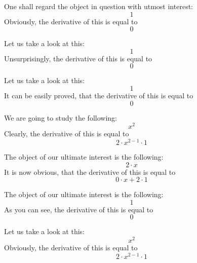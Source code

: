 \documentclass{article}
\begin{document}
One shall regard the object in question with utmost interest:
\begin{equation}
1 
\end{equation}
Obviously, the derivative of this is equal to
\begin{equation}
0 
\end{equation}

Let us take a look at this:
\begin{equation}
1 
\end{equation}
Unsurprisingly, the derivative of this is equal to
\begin{equation}
0 
\end{equation}

Let us take a look at this:
\begin{equation}
1 
\end{equation}
It can be easily proved, that the derivative of this is equal to
\begin{equation}
0 
\end{equation}

We are going to study the following:
\begin{equation}
x ^{2 } 
\end{equation}
Clearly, the derivative of this is equal to
\begin{equation}
2 \cdot x ^{2 - 1 } \cdot 1 
\end{equation}

The object of our ultimate interest is the following:
\begin{equation}
2 \cdot x 
\end{equation}
It is now obvious, that the derivative of this is equal to
\begin{equation}
0 \cdot x + 2 \cdot 1 
\end{equation}

The object of our ultimate interest is the following:
\begin{equation}
1 
\end{equation}
As you can see, the derivative of this is equal to
\begin{equation}
0 
\end{equation}

Let us take a look at this:
\begin{equation}
x ^{2 } 
\end{equation}
Obviously, the derivative of this is equal to
\begin{equation}
2 \cdot x ^{2 - 1 } \cdot 1 
\end{equation}
\end{document}
